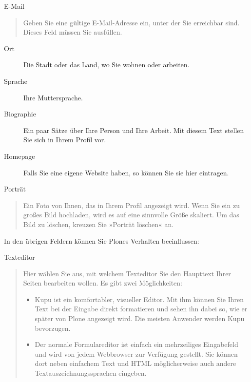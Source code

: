 \documentclass[a4paper,12pt,ngerman]{manual}
\begin{document}
E-Mail
\begin{quote}

Geben Sie eine gültige E-Mail-Adresse ein, unter der
Sie erreichbar sind. Dieses Feld müssen Sie ausfüllen.
\end{quote}
\begin{description}
\item[Ort] \leavevmode
Die Stadt oder das Land, wo Sie wohnen oder arbeiten.

\item[Sprache] \leavevmode
Ihre Muttersprache.

\item[Biographie] \leavevmode
Ein paar Sätze über Ihre Person und Ihre Arbeit. Mit diesem
Text stellen Sie sich in Ihrem Profil vor.

\item[Homepage] \leavevmode
Falls Sie eine eigene Website haben, so können Sie sie hier
eintragen.

\end{description}

Porträt
\begin{quote}

Ein Foto von Ihnen, das in Ihrem Profil angezeigt wird. Wenn Sie ein
zu großes Bild hochladen, wird es auf eine sinnvolle Größe skaliert.
Um das Bild zu löschen, kreuzen Sie »Porträt löschen« an.
\end{quote}

In den übrigen Feldern können Sie Plones Verhalten beeinflussen:

Texteditor
\begin{quote}

Hier wählen Sie aus, mit welchem Texteditor
Sie den Haupttext Ihrer Seiten bearbeiten wollen. Es gibt
zwei Möglichkeiten:
\begin{itemize}
\item {} 
Kupu ist ein komfortabler, visueller Editor. Mit ihm können Sie Ihren
Text bei der Eingabe direkt formatieren und sehen ihn dabei so, wie er
später von Plone angezeigt wird. Die meisten Anwender werden Kupu
bevorzugen.

\item {} 
Der normale Formulareditor ist einfach ein mehrzeiliges Eingabefeld
und wird von jedem Webbrowser zur Verfügung gestellt. Sie können dort
neben einfachem Text und HTML möglicherweise auch andere
Textauszeichnungssprachen eingeben.

\end{itemize}
\end{quote}
\end{document}
